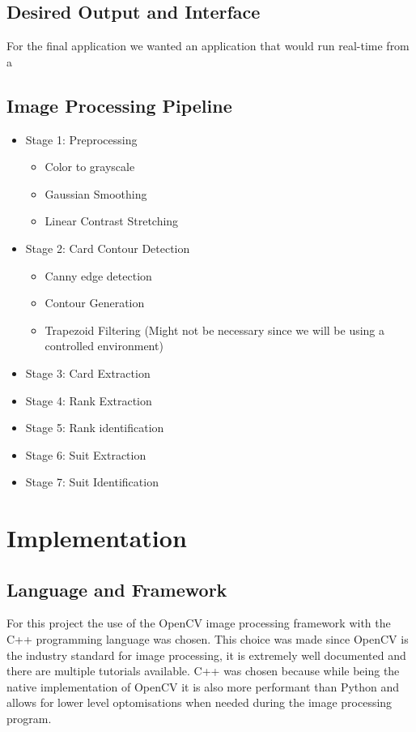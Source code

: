 \documentclass[conference]{IEEEtran}
\begin{document}
\subsection{Desired Output and Interface}
For the final application we wanted an application that would run real-time from a 

\subsection{Image Processing Pipeline}
\begin{itemize}
\item Stage 1: Preprocessing
    \begin{itemize}
        \item Color to grayscale
        \item Gaussian Smoothing
        \item Linear Contrast Stretching
    \end{itemize}
\item Stage 2: Card Contour Detection
    \begin{itemize}
        \item Canny edge detection
        \item Contour Generation
        \item Trapezoid Filtering (Might not be necessary since we will be using a controlled
            environment)
    \end{itemize}
\item Stage 3: Card Extraction
\item Stage 4: Rank Extraction
\item Stage 5: Rank identification
\item Stage 6: Suit Extraction
\item Stage 7: Suit Identification
\end{itemize}

\section{Implementation}

\subsection{Language and Framework}
For this project the use of the OpenCV image processing framework with the C++ programming language
was chosen. This choice was made since OpenCV is the industry standard for image processing, it is
extremely well documented and there are multiple tutorials available. C++ was chosen because while
being the native implementation of OpenCV it is also more performant than Python and allows for
lower level optomisations when needed during the image processing program.
\end{document}
